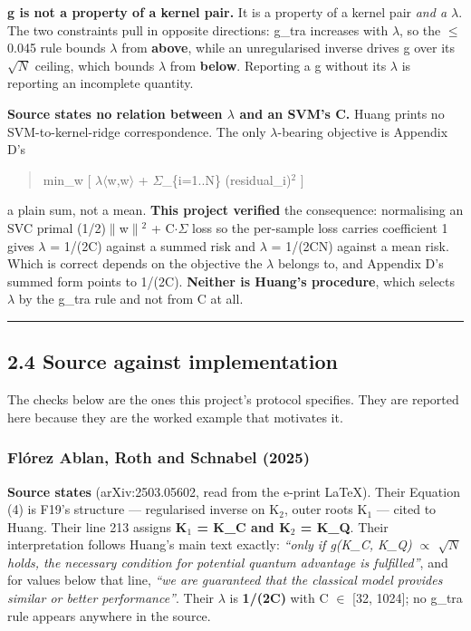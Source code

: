 \documentclass[
  10pt,
]{article}
\begin{document}
\textbf{g is not a property of a kernel pair.} It is a property of a
kernel pair \emph{and a \(\lambda\)}. The two constraints pull in
opposite directions: g\_tra increases with \(\lambda\), so the \(\le\)
0.045 rule bounds \(\lambda\) from \textbf{above}, while an
unregularised inverse drives g over its \(\sqrt{N}\) ceiling, which
bounds \(\lambda\) from \textbf{below}. Reporting a g without its
\(\lambda\) is reporting an incomplete quantity.

\textbf{Source states no relation between \(\lambda\) and an SVM's C.}
Huang prints no SVM-to-kernel-ridge correspondence. The only
\(\lambda\)-bearing objective is Appendix D's

\begin{quote}
min\_w {[} \(\lambda\)\(\langle\)w,w\(\rangle\) + \(\Sigma\)\_\{i=1..N\}
(residual\_i)\(^{2}\) {]}
\end{quote}

a plain sum, not a mean. \textbf{This project verified} the consequence:
normalising an SVC primal (1/2)\(\|\)w\(\|\)\(^{2}\) +
C\(\cdot\)\(\Sigma\) loss so the per-sample loss carries coefficient 1
gives \(\lambda\) = 1/(2C) against a summed risk and \(\lambda\) =
1/(2CN) against a mean risk. Which is correct depends on the objective
the \(\lambda\) belongs to, and Appendix D's summed form points to
1/(2C). \textbf{Neither is Huang's procedure}, which selects \(\lambda\)
by the g\_tra rule and not from C at all.

\begin{center}\rule{0.5\linewidth}{0.5pt}\end{center}

\subsection{2.4 Source against
implementation}\label{source-against-implementation}

The checks below are the ones this project's protocol specifies. They
are reported here because they are the worked example that motivates it.

\subsubsection{Flórez Ablan, Roth and Schnabel
(2025)}\label{fluxf3rez-ablan-roth-and-schnabel-2025}

\textbf{Source states} (arXiv:2503.05602, read from the e-print LaTeX).
Their Equation (4) is F19's structure --- regularised inverse on
K\(_{2}\), outer roots K\(_{1}\) --- cited to Huang. Their line 213
assigns \textbf{K\(_{1}\) = K\_C and K\(_{2}\) = K\_Q}. Their
interpretation follows Huang's main text exactly: \emph{``only if
g(K\_C, K\_Q) \(\propto\) \(\sqrt{N}\) holds, the necessary condition
for potential quantum advantage is fulfilled''}, and for values below
that line, \emph{``we are guaranteed that the classical model provides
similar or better performance''}. Their \(\lambda\) is \textbf{1/(2C)}
with C \(\in\) {[}32, 1024{]}; no g\_tra rule appears anywhere in the
source.
\end{document}
